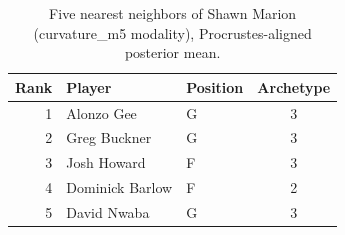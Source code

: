 \begin{table}[htbp]
  \centering\small
  \begin{tabular}{rllc}
    \toprule
    Rank & Player & Position & Archetype \\
    \midrule
    1 & Alonzo Gee & G & 3 \\
    2 & Greg Buckner & G & 3 \\
    3 & Josh Howard & F & 3 \\
    4 & Dominick Barlow & F & 2 \\
    5 & David Nwaba & G & 3 \\
    \bottomrule
  \end{tabular}
  \caption{Five nearest neighbors of Shawn Marion (curvature_m5 modality), Procrustes-aligned posterior mean.}
  \label{tab:Shawn_Marion_neighbors_curvature_m5}
\end{table}

